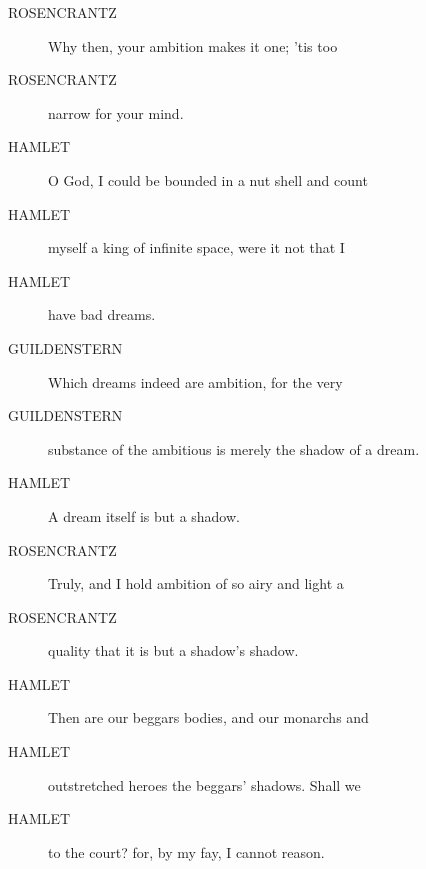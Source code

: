 \documentclass{article}
\begin{document}
\begin{description}
            
\item[ROSENCRANTZ] Why then, your ambition makes it one; 'tis too
\item[ROSENCRANTZ] narrow for your mind.
\end{description}
          
\begin{description}
            
\item[HAMLET] O God, I could be bounded in a nut shell and count
\item[HAMLET] myself a king of infinite space, were it not that I
\item[HAMLET] have bad dreams.
\end{description}
          
\begin{description}
            
\item[GUILDENSTERN] Which dreams indeed are ambition, for the very
\item[GUILDENSTERN] substance of the ambitious is merely the shadow of a dream.
\end{description}
          
\begin{description}
            
\item[HAMLET] A dream itself is but a shadow.
\end{description}
          
\begin{description}
            
\item[ROSENCRANTZ] Truly, and I hold ambition of so airy and light a
\item[ROSENCRANTZ] quality that it is but a shadow's shadow.
\end{description}
          
\begin{description}
            
\item[HAMLET] Then are our beggars bodies, and our monarchs and
\item[HAMLET] outstretched heroes the beggars' shadows. Shall we
\item[HAMLET] to the court? for, by my fay, I cannot reason.
\end{description}
          
\end{document}
